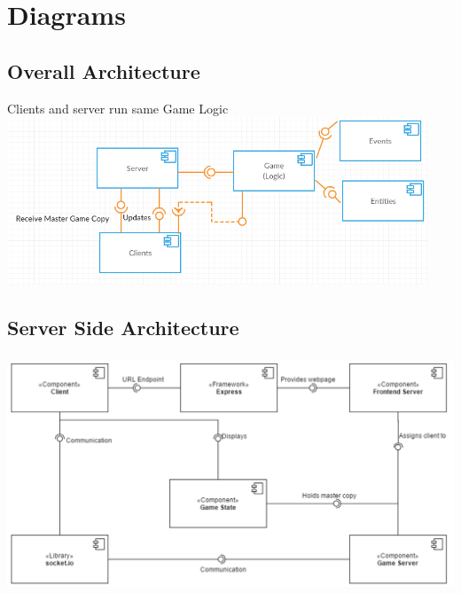 \documentclass[12pt]{report}
\begin{document}

\section{Diagrams}
\subsection{Overall Architecture}
Clients and server run same Game Logic \\
\includegraphics[width=\linewidth,height=5cm]{images/overall_architecture.png}

\subsection{Server Side Architecture}
\includegraphics[width=\linewidth,height=7cm]{images/betterServerArchitecture.png}
\end{document}
